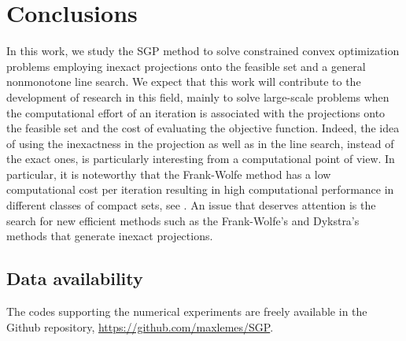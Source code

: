 

\chapter{Conclusions} \label{chap:Conclusions}
In this work, we study the SGP method  to solve   constrained convex optimization problems employing  inexact projections onto the feasible set and a general nonmonotone  line search. We expect that this work will contribute to the development of research in this field, mainly to solve large-scale problems when the computational effort of an iteration is associated with the projections onto the feasible set and  the cost of evaluating the objective function. Indeed, the idea of using the inexactness in the projection as well as in the line search,   instead of the exact ones, is particularly interesting from a computational point of view. In particular,   it is noteworthy that the Frank-Wolfe method  has a low computational cost per iteration  resulting in high computational performance in different classes of compact sets, see \cite{GarberHazan2015, Jaggi2013}.  An issue that deserves attention is the search for new efficient methods such as the Frank-Wolfe's and Dykstra's  methods that generate inexact projections.


\section*{Data availability} 
The codes supporting the numerical experiments are freely available in the Github repository, \url{https://github.com/maxlemes/SGP}.